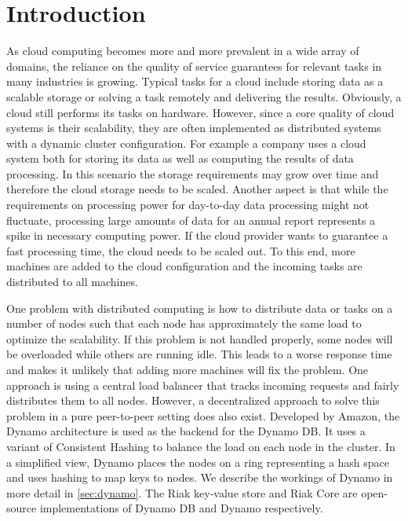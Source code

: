 \chapter{Introduction}
As cloud computing\cite{Wang2010} becomes more and more prevalent in a wide array of domains, the reliance on the quality of service guarantees for relevant tasks in many industries is growing.
Typical tasks for a cloud include storing data as a scalable storage or solving a task remotely and delivering the results.
Obviously, a cloud still performs its tasks on hardware.
However, since a core quality of cloud systems is their scalability, they are often implemented as distributed systems with a dynamic cluster configuration.
For example a company uses a cloud system both for storing its data as well as computing the results of data processing.
In this scenario the storage requirements may grow over time and therefore the cloud storage needs to be scaled.
Another aspect is that while the requirements on processing power for day-to-day data processing might not fluctuate, processing large amounts of data for an annual report represents a spike in necessary computing power.
If the cloud provider wants to guarantee a fast processing time, the cloud needs to be scaled out.
To this end, more machines are added to the cloud configuration and the incoming tasks are distributed to all machines.

One problem with distributed computing is how to distribute data or tasks on a number of nodes such that each node has approximately the same load to optimize the scalability.
If this problem is not handled properly, some nodes will be overloaded while others are running idle.
This leads to a worse response time and makes it unlikely that adding more machines will fix the problem.
One approach is using a central load balancer\cite{Kansal2012} that tracks incoming requests and fairly distributes them to all nodes.
However, a decentralized approach to solve this problem in a pure peer-to-peer setting does also exist.
Developed by Amazon, the Dynamo\cite{DeCandia2007} architecture is used as the backend for the Dynamo DB.
It uses a variant of Consistent Hashing\cite{Karger1997} to balance the load on each node in the cluster.
In a simplified view, Dynamo places the nodes on a ring representing a hash space and uses hashing to map keys to nodes.
We describe the workings of Dynamo in more detail in \cref{sec:dynamo}.
The Riak key-value store and Riak Core are open-source implementations of Dynamo DB and Dynamo respectively.

